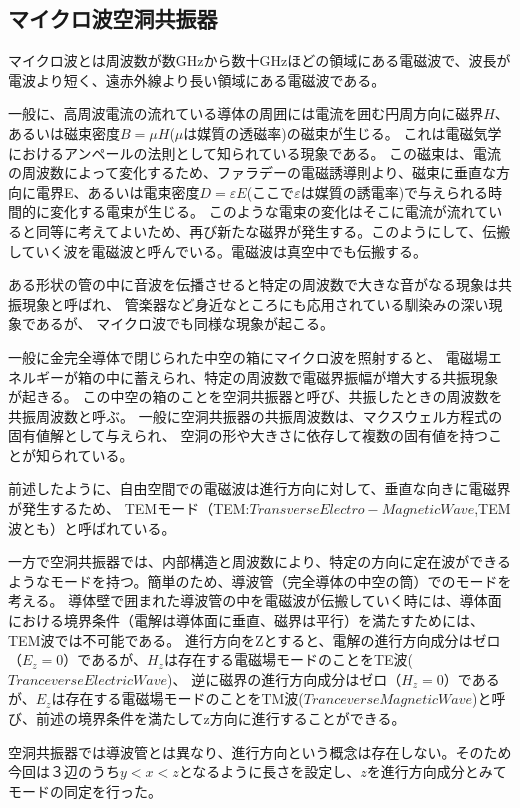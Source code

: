 \subsection{マイクロ波空洞共振器}
マイクロ波とは周波数が数GHzから数十GHzほどの領域にある電磁波で、波長が電波より短く、遠赤外線より長い領域にある電磁波である。

一般に、高周波電流の流れている導体の周囲には電流を囲む円周方向に磁界$H$、あるいは磁束密度$B =μH$($μ$は媒質の透磁率)の磁束が生じる。
これは電磁気学におけるアンペールの法則として知られている現象である。
この磁束は、電流の周波数によって変化するため、ファラデーの電磁誘導則より、磁束に垂直な方向に電界E、あるいは電束密度$D =εE$(ここで$ε$は媒質の誘電率)で与えられる時間的に変化する電束が生じる。
このような電束の変化はそこに電流が流れていると同等に考えてよいため、再び新たな磁界が発生する。このようにして、伝搬していく波を電磁波と呼んでいる。電磁波は真空中でも伝搬する。

ある形状の管の中に音波を伝播させると特定の周波数で大きな音がなる現象は共振現象と呼ばれ、
管楽器など身近なところにも応用されている馴染みの深い現象であるが、
マイクロ波でも同様な現象が起こる。

一般に金完全導体で閉じられた中空の箱にマイクロ波を照射すると、
電磁場エネルギーが箱の中に蓄えられ、特定の周波数で電磁界振幅が増大する共振現象が起きる。
この中空の箱のことを空洞共振器と呼び、共振したときの周波数を共振周波数と呼ぶ。
一般に空洞共振器の共振周波数は、マクスウェル方程式の固有値解として与えられ、
空洞の形や大きさに依存して複数の固有値を持つことが知られている。

前述したように、自由空間での電磁波は進行方向に対して、垂直な向きに電磁界が発生するため、
TEMモード（TEM:$Transverse Electro-Magnetic Wave$,TEM波とも）と呼ばれている。

一方で空洞共振器では、内部構造と周波数により、特定の方向に定在波ができるようなモードを持つ。簡単のため、導波管（完全導体の中空の筒）でのモードを考える。
導体壁で囲まれた導波管の中を電磁波が伝搬していく時には、導体面における境界条件（電解は導体面に垂直、磁界は平行）を満たすためには、TEM波では不可能である。
進行方向をZとすると、電解の進行方向成分はゼロ（$E_z = 0$）であるが、$H_z$は存在する電磁場モードのことをTE波($Tranceverse Electric Wave$)、
逆に磁界の進行方向成分はゼロ（$H_z=0$）であるが、$E_z$は存在する電磁場モードのことをTM波($Tranceverse Magnetic Wave$)と呼び、前述の境界条件を満たしてz方向に進行することができる。

空洞共振器では導波管とは異なり、進行方向という概念は存在しない。そのため今回は３辺のうち$y<x<z$となるように長さを設定し、$z$を進行方向成分とみてモードの同定を行った。

